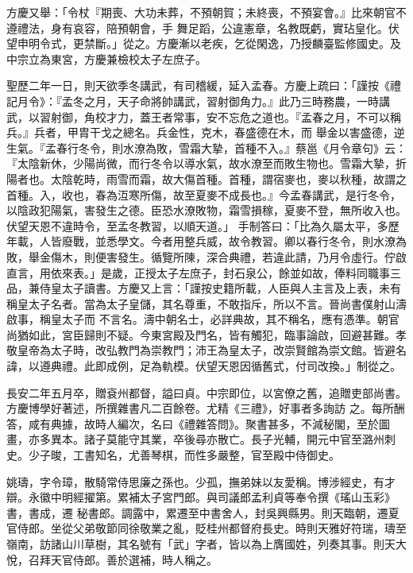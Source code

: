 \begin{pinyinscope}
 方慶又舉：「令杖『期喪、大功未葬，不預朝賀；未終喪，不預宴會。』比來朝官不遵禮法，身有哀容，陪預朝會，手
 舞足蹈，公違憲章，名教既虧，實玷皇化。伏望申明令式，更禁斷。」從之。方慶漸以老疾，乞從閑逸，乃授麟臺監修國史。及中宗立為東宮，方慶兼檢校太子左庶子。



 聖歷二年一日，則天欲季冬講武，有司稽緩，延入孟春。方慶上疏曰：「謹按《禮記月令》：『孟冬之月，天子命將帥講武，習射御角力。』此乃三時務農，一時講武，以習射御，角校才力，蓋王者常事，安不忘危之道也。『孟春之月，不可以稱兵。』兵者，甲胄干戈之總名。兵金性，克木，春盛德在木，而
 舉金以害盛德，逆生氣。『孟春行冬令，則水潦為敗，雪霜大摯，首種不入。』蔡邕《月令章句》云：『太陰新休，少陽尚微，而行冬令以導水氣，故水潦至而敗生物也。雪霜大摯，折陽者也。太陰乾時，雨雪而霜，故大傷首種。首種，謂宿麥也，麥以秋種，故謂之首種。入，收也，春為沍寒所傷，故至夏麥不成長也。』今孟春講武，是行冬令，以陰政犯陽氣，害發生之德。臣恐水潦敗物，霜雪損稼，夏麥不登，無所收入也。伏望天恩不違時令，至孟冬教習，以順天道。」
 手制答曰：「比為久屬太平，多歷年載，人皆廢戰，並悉學文。今者用整兵威，故令教習。卿以春行冬令，則水潦為敗，舉金傷木，則便害發生。循覽所陳，深合典禮，若違此請，乃月令虛行。佇啟直言，用依來表。」是歲，正授太子左庶子，封石泉公，餘並如故，俸料同職事三品，兼侍皇太子讀書。方慶又上言：「謹按史籍所載，人臣與人主言及上表，未有稱皇太子名者。當為太子皇儲，其名尊重，不敢指斥，所以不言。晉尚書僕射山濤啟事，稱皇太子而
 不言名。濤中朝名士，必詳典故，其不稱名，應有憑準。朝官尚猶如此，宮臣歸則不疑。今東宮殿及門名，皆有觸犯，臨事論啟，回避甚難。孝敬皇帝為太子時，改弘教門為崇教門；沛王為皇太子，改崇賢館為崇文館。皆避名諱，以遵典禮。此即成例，足為軌模。伏望天恩因循舊式，付司改換。」制從之。



 長安二年五月卒，贈袞州都督，謚曰貞。中宗即位，以宮僚之舊，追贈吏部尚書。方慶博學好著述，所撰雜書凡二百餘卷。尤精《三禮》，好事者多詢訪
 之。每所酬答，咸有典據，故時人編次，名曰《禮雜答問》。聚書甚多，不減秘閣，至於圖畫，亦多異本。諸子莫能守其業，卒後尋亦散亡。長子光輔，開元中官至潞州刺史。少子晙，工書知名，尤善琴棋，而性多嚴整，官至殿中侍御史。



 姚璹，字令璋，散騎常侍思廉之孫也。少孤，撫弟妹以友愛稱。博涉經史，有才辯。永徽中明經擢第。累補太子宮門郎。與司議郎孟利貞等奉令撰《瑤山玉彩》書，書成，遷
 秘書郎。調露中，累遷至中書舍人，封吳興縣男。則天臨朝，遷夏官侍郎。坐從父弟敬節同徐敬業之亂，貶桂州都督府長史。時則天雅好符瑞，璹至嶺南，訪諸山川草樹，其名號有「武」字者，皆以為上膺國姓，列奏其事。則天大悅，召拜天官侍郎。善於選補，時人稱之。




\end{pinyinscope}
